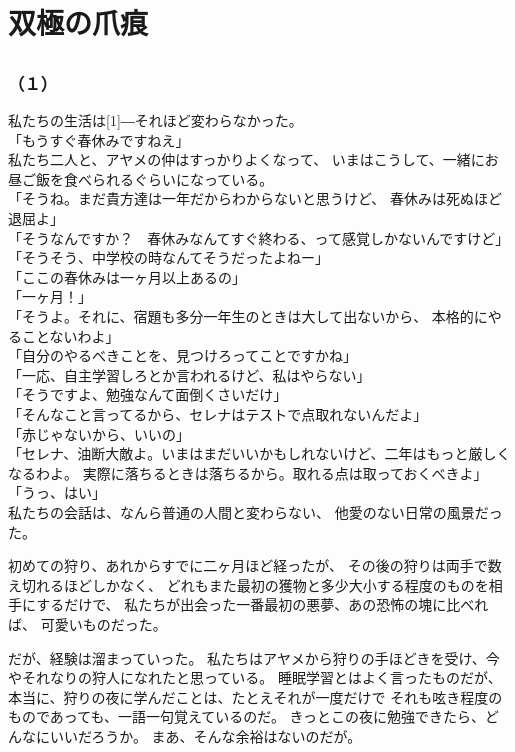 \documentclass[../IHMain]{subfiles}
\begin{document}
\chapter{双極の爪痕}
\section{}
\subsection*{（１）}
私たちの生活は\scalebox{3}[1]{―}それほど変わらなかった。\\
「もうすぐ春休みですねえ」\\
私たち二人と、アヤメの仲はすっかりよくなって、
いまはこうして、一緒にお昼ご飯を食べられるぐらいになっている。\\
「そうね。まだ貴方達は一年だからわからないと思うけど、
春休みは死ぬほど退屈よ」\\
「そうなんですか？　春休みなんてすぐ終わる、って感覚しかないんですけど」\\
「そうそう、中学校の時なんてそうだったよねー」\\
「ここの春休みは一ヶ月以上あるの」\\
「一ヶ月！」\\
「そうよ。それに、宿題も多分一年生のときは大して出ないから、
本格的にやることないわよ」\\
「自分のやるべきことを、見つけろってことですかね」\\
「一応、自主学習しろとか言われるけど、私はやらない」\\
「そうですよ、勉強なんて面倒くさいだけ」\\
「そんなこと言ってるから、セレナはテストで点取れないんだよ」\\
「赤じゃないから、いいの」\\
「セレナ、油断大敵よ。いまはまだいいかもしれないけど、二年はもっと厳しくなるわよ。
実際に落ちるときは落ちるから。取れる点は取っておくべきよ」\\
「うっ、はい」\\
私たちの会話は、なんら普通の人間と変わらない、
他愛のない日常の風景だった。

初めての狩り、あれからすでに二ヶ月ほど経ったが、
その後の狩りは両手で数え切れるほどしかなく、
どれもまた最初の獲物と多少大小する程度のものを相手にするだけで、
私たちが出会った一番最初の悪夢、あの恐怖の塊に比べれば、
可愛いものだった。

だが、経験は溜まっていった。
私たちはアヤメから狩りの手ほどきを受け、今やそれなりの狩人になれたと思っている。
睡眠学習とはよく言ったものだが、本当に、狩りの夜に学んだことは、たとえそれが一度だけで
それも呟き程度のものであっても、一語一句覚えているのだ。
きっとこの夜に勉強できたら、どんなにいいだろうか。
まあ、そんな余裕はないのだが。
\end{document}
